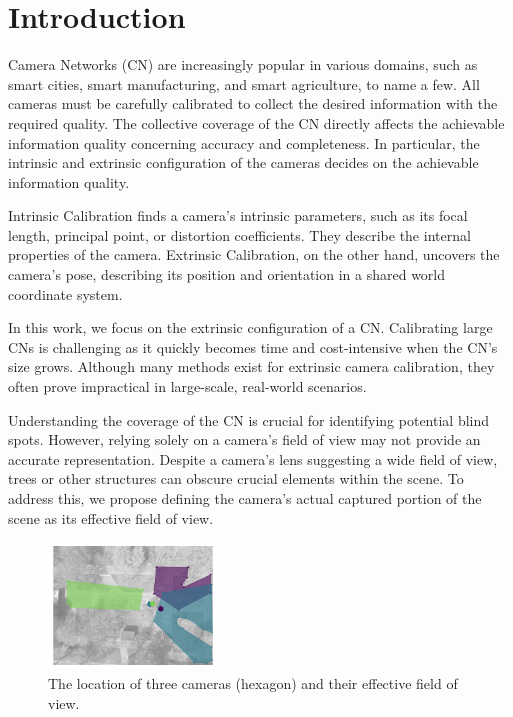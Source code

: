 \section{Introduction}
Camera Networks (CN) are increasingly popular in various domains, such as 
smart cities, smart manufacturing, and smart agriculture, to name a few. 
All cameras must be carefully calibrated to collect the desired information 
with the required quality. 
The collective coverage of the CN directly affects the achievable information 
quality concerning accuracy and completeness. In particular, the intrinsic 
and extrinsic configuration of the cameras decides on the achievable 
information quality.

Intrinsic Calibration finds a camera's intrinsic parameters, such as its 
focal length, principal point, or distortion coefficients. They describe 
the internal properties of the camera. Extrinsic Calibration, on the other 
hand, uncovers the camera's pose, describing its position and orientation in 
a shared world coordinate system.

In this work, we focus on the extrinsic configuration of a CN. Calibrating 
large CNs is challenging as it quickly becomes time and 
cost-intensive when the CN's size grows. Although many methods exist for 
extrinsic camera calibration, they often prove impractical in large-scale, 
real-world scenarios.

Understanding the coverage of the CN is crucial for identifying 
potential blind spots. However, relying solely on a camera's field of view 
may not provide an accurate representation. Despite a camera's lens 
suggesting a wide field of view, trees or other structures 
can obscure crucial elements within the scene. To address this, we 
propose defining the camera's actual captured portion of the scene as 
its effective field of view.

\begin{figure}
	\centering
	\includegraphics[width=0.4\textwidth]{figures/overview.png}
	\caption{
	The location of three cameras (hexagon) and their effective
	field of view. 
	}
	\label{fig:overview}
\end{figure}

